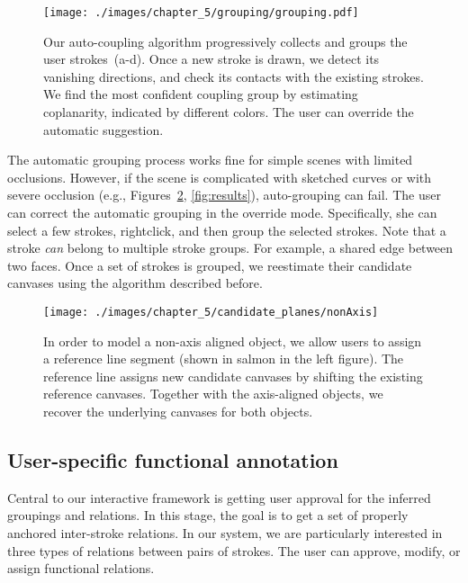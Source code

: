 \begin{figure}[b!]
  \texttt{[image: ./images/chapter\_5/grouping/grouping.pdf]}
  \caption[Stroke grouping.]{Our auto-coupling algorithm progressively collects and groups the user strokes~(a-d). Once a new stroke is drawn, we detect its vanishing directions, and check its contacts with the existing strokes. We find the most confident coupling group by estimating coplanarity, indicated by different colors. The user can override the automatic suggestion.
  }
  \label{fig:grouping}
\end{figure}


The automatic grouping process works fine for simple scenes with limited occlusions. However, if the scene is complicated with sketched curves or with severe occlusion (e.g., Figures~\ref{fig:nonAxis}, \ref{fig:results}), auto-grouping can fail. The user can correct the automatic grouping in the override mode. Specifically, she can select a few strokes, rightclick, and then group the selected strokes. Note that a stroke {\em can} belong to multiple stroke groups. For example, a shared edge between two faces. Once a set of strokes is grouped, we reestimate their candidate canvases using the algorithm described before.

\begin{figure}[b!]
  \texttt{[image: ./images/chapter\_5/candidate\_planes/nonAxis]}
  \caption[Non-axis aligned objects.]{In order to model a non-axis aligned object, we allow users to assign a reference line segment (shown in salmon in the left figure). The reference line assigns new candidate canvases by shifting the existing reference canvases. Together with the axis-aligned objects, we recover the underlying canvases for both objects.
  \label{fig:nonAxis}}
\end{figure}

\subsection{User-specific functional annotation}

Central to our interactive framework is getting user approval for the inferred groupings and relations. In this stage, the goal is to get a set of properly anchored inter-stroke relations. In our system, we are particularly interested in three types of relations between pairs of strokes. The user can approve, modify, or assign functional relations.

